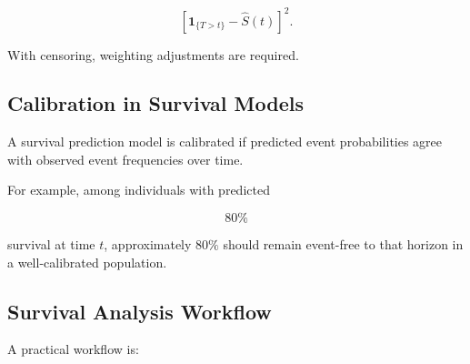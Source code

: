 \[
\boxed{
[
\mathbf{1}_{\{T>t\}}
-
\widehat{S}(t)
]^2.
}
\]

With censoring, weighting adjustments are required.

\subsection{Calibration in Survival Models}
\label{subsec:survival-calibration}

A survival prediction model is calibrated if predicted event
probabilities agree with observed event frequencies over time.

For example, among individuals with predicted

\[
80\%
\]

survival at time \(t\), approximately \(80\%\) should remain event-free
to that horizon in a well-calibrated population.

\subsection{Survival Analysis Workflow}
\label{subsec:survival-analysis-workflow}

A practical workflow is:

